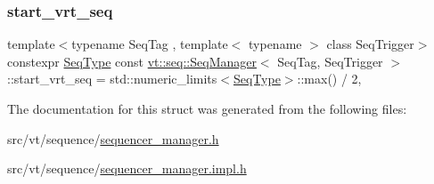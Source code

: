\mbox{\label{structvt_1_1seq_1_1_seq_manager_aae6446338964093292b8dcaa79d77f96}} 
\subsubsection{\texorpdfstring{start\+\_\+vrt\+\_\+seq}{start\_vrt\_seq}}
{\footnotesize\ttfamily template$<$typename Seq\+Tag , template$<$ typename $>$ class Seq\+Trigger$>$ \\
constexpr \hyperlink{structvt_1_1seq_1_1_seq_manager_a46a40595599aa666e9cf9f46ee30cfde}{Seq\+Type} const \hyperlink{structvt_1_1seq_1_1_seq_manager}{vt\+::seq\+::\+Seq\+Manager}$<$ Seq\+Tag, Seq\+Trigger $>$\+::start\+\_\+vrt\+\_\+seq = std\+::numeric\+\_\+limits$<$\hyperlink{structvt_1_1seq_1_1_seq_manager_a46a40595599aa666e9cf9f46ee30cfde}{Seq\+Type}$>$\+::max() / 2\hspace{0.3cm}{\ttfamily [static]}, {\ttfamily [private]}}



The documentation for this struct was generated from the following files\+:\begin{DoxyCompactItemize}
\item 
src/vt/sequence/\hyperlink{sequencer__manager_8h}{sequencer\+\_\+manager.\+h}\item 
src/vt/sequence/\hyperlink{sequencer__manager_8impl_8h}{sequencer\+\_\+manager.\+impl.\+h}\end{DoxyCompactItemize}

